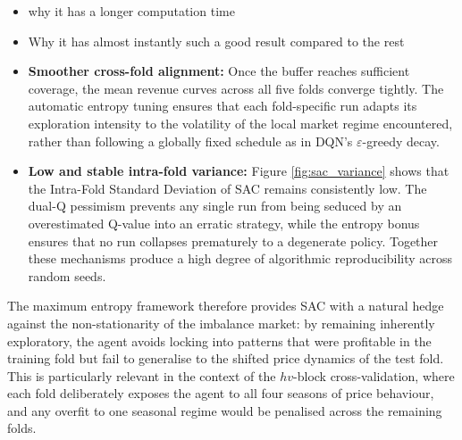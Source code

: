             \begin{itemize}
                \item why it has a longer computation time

                \item Why it has almost instantly such a good result compared to the rest

                \item \textbf{Smoother cross-fold alignment:} Once the buffer reaches sufficient coverage, the mean revenue curves across all five folds converge tightly. The automatic entropy tuning ensures that each fold-specific run adapts its exploration intensity to the volatility of the local market regime encountered, rather than following a globally fixed schedule as in DQN's $\varepsilon$-greedy decay.

                \item 
                \textbf{Low and stable intra-fold variance:} Figure \ref{fig:sac_variance} shows that the Intra-Fold Standard Deviation of SAC remains consistently low. The dual-Q pessimism prevents any single run from being seduced by an overestimated Q-value into an erratic strategy, while the entropy bonus ensures that no run collapses prematurely to a degenerate policy. Together these mechanisms produce a high degree of algorithmic reproducibility across random seeds.

            \end{itemize}

            The maximum entropy framework therefore provides SAC with a natural hedge against the non-stationarity of the imbalance market: by remaining inherently exploratory, the agent avoids locking into patterns that were profitable in the training fold but fail to generalise to the shifted price dynamics of the test fold. This is particularly relevant in the context of the $hv$-block cross-validation, where each fold deliberately exposes the agent to all four seasons of price behaviour, and any overfit to one seasonal regime would be penalised across the remaining folds.


